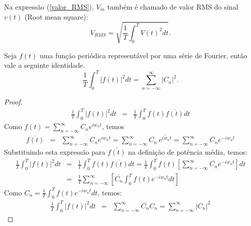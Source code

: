 \begin{obs}Na expressão (\ref{valor_RMS}), $V_m$ também é chamado de valor RMS do sinal $v(t)$ (Root mean square):
\begin{equation}
V_{RMS}=\sqrt{\frac{1}{T}\int_0^T V(t)^2 dt}.
\end{equation}
\end{obs}
\begin{teo} Seja $f(t)$ uma função periódica representável por uma série de Fourier, então vale a seguinte identidade.
\begin{equation}\label{teo_parseval} 
\frac{1}{T}\int_0^T |f(t)|^2dt=\sum_{n=-\infty}^\infty |C_n|^2.
 \end{equation}
\end{teo}
\begin{proof}
\begin{eqnarray*}
 \frac{1}{T}\int_0^T |f(t)|^2dt&=&\frac{1}{T}\int_0^T f(t)\overline{f(t)}dt
\end{eqnarray*}
 Como $\displaystyle f(t)=\sum_{n=-\infty}^\infty C_n e^{iw_n t}$, temos
 \begin{eqnarray*}
  \overline{f(t)}&=&\overline{\sum_{n=-\infty}^\infty C_n e^{iw_n t}}
  =\sum_{n=-\infty}^\infty \overline{C_n}~ \overline{e^{iw_n t}}
  =\sum_{n=-\infty}^\infty \overline{C_n} e^{-iw_n t}
 \end{eqnarray*}
Substituindo esta expressão para $\overline{f(t)}$ na definição de potência média, temos:
\begin{eqnarray*}
 \frac{1}{T}\int_0^T |f(t)|^2dt&=&\frac{1}{T}\int_0^T f(t)\overline{f(t)}dt=\frac{1}{T}\int_0^Tf(t)\left[\sum_{n=-\infty}^\infty \overline{C_n} e^{-iw_n t}\right] dt\\
 &=&\frac{1}{T}\sum_{n=-\infty}^\infty\left[\overline{C_n}\int_0^Tf(t)e^{-iw_nt}dt\right]
 \end{eqnarray*}
 Como $C_n=\frac{1}{T}\int_0^Tf(t)e^{-iw_nt}dt$, temos:
\begin{eqnarray*}
 \frac{1}{T}\int_0^T |f(t)|^2dt&=&\sum_{n=-\infty}^\infty\overline{C_n}C_n = \sum_{n=-\infty}^\infty|C_n|^2
 \end{eqnarray*}
\end{proof}
